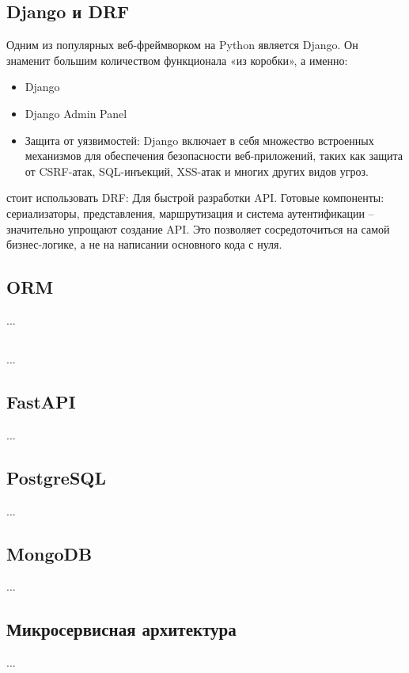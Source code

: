\subsection{Django и DRF}
Одним из популярных веб-фреймворком на Python является Django.
Он знаменит большим количеством функционала «из коробки», а именно:
\begin{itemize}
    \item Django~
    \item Django Admin Panel
    \item Защита от уязвимостей:
    Django включает в себя множество встроенных механизмов для обеспечения безопасности веб-приложений, таких как защита от
    CSRF-атак,
    SQL-инъекций,
    XSS-атак и многих других видов угроз.
\end{itemize}
стоит использовать DRF: Для быстрой разработки API.
Готовые компоненты: сериализаторы, представления, маршрутизация и система аутентификации – значительно упрощают создание API.
Это позволяет сосредоточиться на самой бизнес-логике, а не на написании основного кода с нуля.

\subsection{ORM}
...

\subsection{}
...

\subsection{FastAPI}
...

\subsection{PostgreSQL}
...

\subsection{MongoDB}
...

\subsection{Микросервисная архитектура}
...

